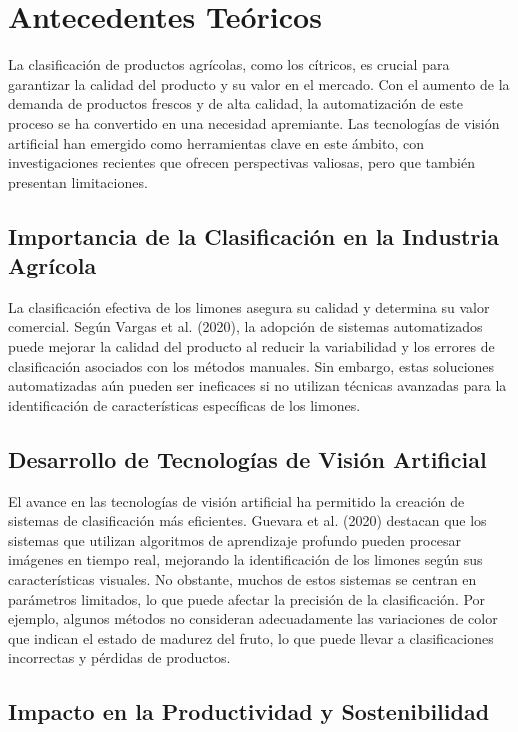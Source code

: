 \section{Antecedentes Teóricos}

La clasificación de productos agrícolas, como los cítricos, es crucial para garantizar la calidad del producto y su valor en el mercado. Con el aumento de la demanda de productos frescos y de alta calidad, la automatización de este proceso se ha convertido en una necesidad apremiante. Las tecnologías de visión artificial han emergido como herramientas clave en este ámbito, con investigaciones recientes que ofrecen perspectivas valiosas, pero que también presentan limitaciones.

\subsection{Importancia de la Clasificación en la Industria Agrícola}

La clasificación efectiva de los limones asegura su calidad y determina su valor comercial. Según Vargas et al. (2020), la adopción de sistemas automatizados puede mejorar la calidad del producto al reducir la variabilidad y los errores de clasificación asociados con los métodos manuales. Sin embargo, estas soluciones automatizadas aún pueden ser ineficaces si no utilizan técnicas avanzadas para la identificación de características específicas de los limones.

\subsection{Desarrollo de Tecnologías de Visión Artificial}

El avance en las tecnologías de visión artificial ha permitido la creación de sistemas de clasificación más eficientes. Guevara et al. (2020) destacan que los sistemas que utilizan algoritmos de aprendizaje profundo pueden procesar imágenes en tiempo real, mejorando la identificación de los limones según sus características visuales. No obstante, muchos de estos sistemas se centran en parámetros limitados, lo que puede afectar la precisión de la clasificación. Por ejemplo, algunos métodos no consideran adecuadamente las variaciones de color que indican el estado de madurez del fruto, lo que puede llevar a clasificaciones incorrectas y pérdidas de productos.

\subsection{Impacto en la Productividad y Sostenibilidad}


